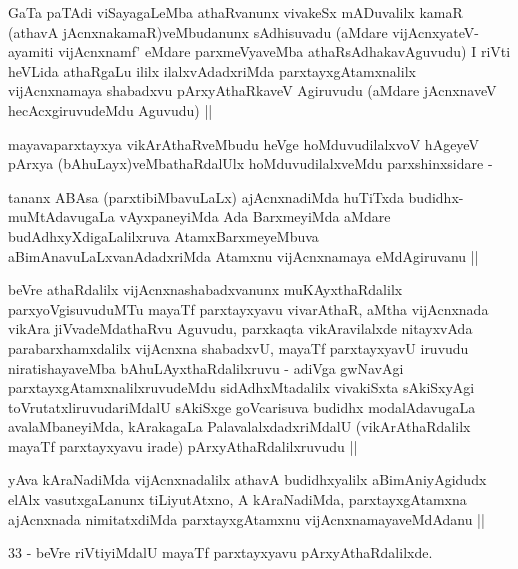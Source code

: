 \begin{artha}
GaTa paTAdi viSayagaLeMba athaRvanunx vivakeSx mADuvalilx kamaR (athavA jAcnxnakamaR)veMbudanunx sAdhisuvadu (aMdare vijAcnxyateV-ayamiti vijAcnxnamf' eMdare parxmeVyaveMba athaRsAdhakavAguvudu) I riVti heVLida athaRgaLu ililx ilalxvAdadxriMda parxtayxgAtamxnalilx vijAcnxnamaya shabadxvu pArxyAthaRkaveV Agiruvudu (aMdare jAcnxnaveV hecAcxgiruvudeMdu Aguvudu) ||\\
\end{artha}

\begin{artha}
mayavaparxtayxya vikArAthaRveMbudu heVge hoMduvudilalxvoV hAgeyeV pArxya (bAhuLayx)veMbathaRdalUlx hoMduvudilalxveMdu parxshinxsidare -
\end{artha}

\begin{artha}
tananx ABAsa (parxtibiMbavuLaLx) ajAcnxnadiMda huTiTxda budidhx-muMtAdavugaLa vAyxpaneyiMda Ada BarxmeyiMda aMdare budAdhxyXdigaLalilxruva AtamxBarxmeyeMbuva aBimAnavuLaLxvanAdadxriMda Atamxnu vijAcnxnamaya eMdAgiruvanu ||
\end{artha}


\begin{artha}
beVre athaRdalilx vijAcnxnashabadxvanunx muKAyxthaRdalilx parxyoVgisuvuduMTu mayaTf parxtayxyavu vivarAthaR, aMtha vijAcnxnada vikAra jiVvadeMdathaRvu Aguvudu, parxkaqta vikAravilalxde nitayxvAda parabarxhamxdalilx vijAcnxna shabadxvU, mayaTf parxtayxyavU iruvudu niratishayaveMba bAhuLAyxthaRdalilxruvu - adiVga gwNavAgi parxtayxgAtamxnalilxruvudeMdu sidAdhxMtadalilx vivakiSxta sAkiSxyAgi toVrutatxliruvudariMdalU sAkiSxge goVcarisuva budidhx modalAdavugaLa avalaMbaneyiMda, kArakagaLa PalavalalxdadxriMdalU (vikArAthaRdalilx mayaTf parxtayxyavu irade) pArxyAthaRdalilxruvudu ||
\end{artha}

\begin{artha}
yAva kAraNadiMda vijAcnxnadalilx athavA budidhxyalilx aBimAniyAgidudx elAlx vasutxgaLanunx tiLiyutAtxno, A kAraNadiMda, parxtayxgAtamxna ajAcnxnada nimitatxdiMda parxtayxgAtamxnu vijAcnxnamayaveMdAdanu ||
\end{artha}

\begin{artha}
33 - beVre riVtiyiMdalU mayaTf parxtayxyavu pArxyAthaRdalilxde.
\end{artha}

